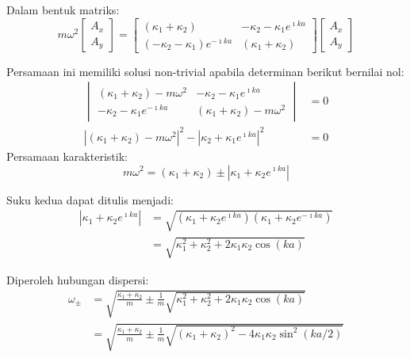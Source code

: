 Dalam bentuk matriks:
\begin{equation*}
m\omega^2 \begin{bmatrix}
A_{x} \\
A_{y}
\end{bmatrix} = 
\begin{bmatrix}
(\kappa_{1} + \kappa_{2}) & -\kappa_{2} - \kappa_{1} e^{\imath k a} \\
(-\kappa_{2} - \kappa_{1})e^{-\imath k a} & (\kappa_{1} + \kappa_{2})
\end{bmatrix}
\begin{bmatrix}
A_{x} \\
A_{y}
\end{bmatrix}    
\end{equation*}

Persamaan ini memiliki solusi non-trivial apabila determinan berikut
bernilai nol:
\begin{align*}
\begin{vmatrix}
(\kappa_{1} + \kappa_{2}) - m\omega^2 & -\kappa_{2} - \kappa_{1} e^{\imath k a} \\
-\kappa_{2} - \kappa_{1}e^{-\imath k a} & (\kappa_{1} + \kappa_{2}) - m\omega^2
\end{vmatrix} & = 0 \\
\left| (\kappa_{1} + \kappa_{2}) - m\omega^2 \right|^2 -
\left| \kappa_{2} + \kappa_{1}e^{\imath k a} \right|^2 & = 0
\end{align*}
Persamaan karakteristik:
\begin{equation*}
m\omega^2 = (\kappa_{1} + \kappa_{2}) \pm 
\left| \kappa_{1} + \kappa_{2} e^{\imath k a}\right|    
\end{equation*}

Suku kedua dapat ditulis menjadi:
\begin{align}
\left| \kappa_{1} + \kappa_{2} e^{\imath ka} \right| & = 
\sqrt{( \kappa_{1} + \kappa_{2} e^{\imath ka} )
  ( \kappa_{1} + \kappa_{2} e^{-\imath ka} ) } \\
& = \sqrt{ \kappa_{1}^{2} + \kappa_{2}^{2} + 2\kappa_{1} \kappa_{2} \cos(ka) }
\end{align}

Diperoleh hubungan dispersi:
\begin{align}
\omega_{\pm} & = \sqrt{\frac{\kappa_{1} + \kappa_{2}}{m} \pm
\frac{1}{m}\sqrt{ \kappa_{1}^{2} + \kappa_{2}^{2} + 2\kappa_{1} \kappa_{2} \cos(ka) }
} \\
& = \sqrt{\frac{\kappa_{1} + \kappa_{2}}{m} \pm
\frac{1}{m}\sqrt{ (\kappa_{1} + \kappa_{2})^{2} - 4\kappa_{1} \kappa_{2} \sin^{2}(ka/2) }
}
\end{align}

